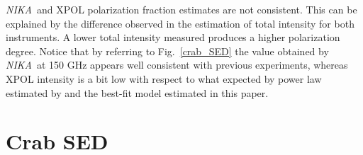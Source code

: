 \documentclass[twocolumn,traditabstract]{aa}
\def\NIKA{\textit{NIKA}}
\def\Planck{\textit{Planck}}
\def\WMAP{\textit{WMAP}}
\begin{document}

\NIKA\ and XPOL polarization fraction estimates are not consistent. This can be explained by the difference observed in the estimation of total intensity for both instruments. A lower total intensity measured produces a higher polarization degree. Notice that by referring to Fig.~\ref{crab_SED} the value obtained by \NIKA\ at 150 GHz appears well consistent with previous experiments, whereas XPOL intensity is a bit low with respect to what expected by power law estimated by \citep{macias2010} and the best-fit model estimated in this paper.

\section{Crab SED}\label{sec:Polarization intensity Spectral Energy Density (SED)}
\end{document}
